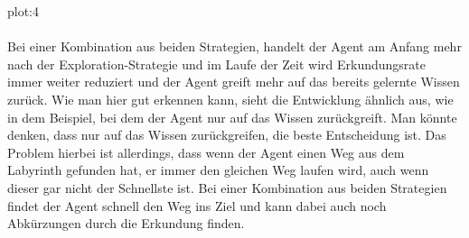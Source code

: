 \documentclass[12pt,titlepage]{article}
\begin{document}
plot:4\\\\
Bei einer Kombination aus beiden Strategien, handelt der Agent am Anfang mehr nach der Exploration-Strategie und im Laufe der Zeit wird Erkundungsrate immer weiter reduziert und der Agent greift mehr auf das bereits gelernte Wissen zurück. Wie man hier gut erkennen kann, sieht die Entwicklung ähnlich aus, wie in dem Beispiel, bei dem der Agent nur auf das Wissen zurückgreift. Man könnte denken, dass nur auf das Wissen zurückgreifen, die beste Entscheidung ist. 
Das Problem hierbei ist allerdings, dass wenn der Agent einen Weg aus dem Labyrinth gefunden hat, er immer den gleichen Weg laufen wird, auch wenn dieser gar nicht der Schnellste ist. Bei einer Kombination aus beiden Strategien findet der Agent schnell den Weg ins Ziel und kann dabei auch noch Abkürzungen durch die Erkundung finden.
\end{document}
